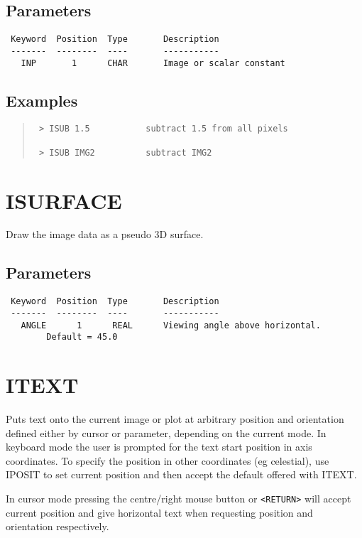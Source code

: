 \documentclass{book}
\renewcommand{\_}{{\tt\char'137}}     %
\begin{document}
\subsection{Parameters}
\begin{verbatim}
 Keyword  Position  Type       Description
 -------  --------  ----       -----------
   INP       1      CHAR       Image or scalar constant

\end{verbatim}\subsection{Examples}
\begin{quote}\begin{verbatim}
 > ISUB 1.5           subtract 1.5 from all pixels

 > ISUB IMG2          subtract IMG2
 \end{verbatim}\end{quote}
\section{ISURFACE}
Draw the image data as a pseudo 3D surface.

\subsection{Parameters}
\begin{verbatim}
 Keyword  Position  Type       Description
 -------  --------  ----       -----------
   ANGLE      1      REAL      Viewing angle above horizontal.
        Default = 45.0

\end{verbatim}\section{ITEXT}
Puts text onto the current image or plot at arbitrary position
and orientation defined either by cursor or parameter, depending
on the current mode. In keyboard mode the user is prompted for
the text start position in axis coordinates. To specify the
position in other coordinates (eg celestial), use IPOSIT to
set current position and then accept the default offered with
ITEXT.

In cursor mode pressing the centre/right mouse button or \verb+<RETURN>+
will accept current position and give horizontal text when
requesting position and orientation respectively.
\end{document}
